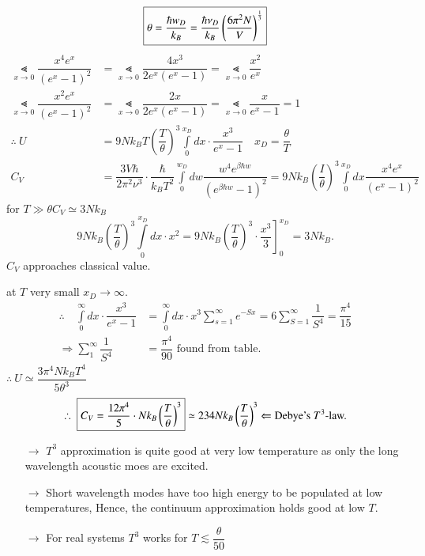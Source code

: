 \chapter{}\label{lec20}

$$
\fbox{$\theta=\dfrac{\hbar w_{D}}{k_{B}}=\dfrac{\hbar \nu_{D}}{k_{B}}\left(\dfrac{6\pi^{2}N}{V}\right)^{\frac{1}{3}}$}
$$
\begin{align*}
\Lt\limits_{x\to 0}\dfrac{x^{4}e^{x}}{(e^{x}-1)^{2}} &= \Lt\limits_{x\to 0}\dfrac{4x^{3}}{2e^{x}(e^{x}-1)}=\Lt\limits_{x\to 0}\dfrac{x^{2}}{e^{x}}\\
\Lt\limits_{x\to 0}\dfrac{x^{2}e^{x}}{(e^{x}-1)^{2}} &= \Lt\limits_{x\to 0}\dfrac{2x}{2e^{x}(e^{x}-1)}=\Lt\limits_{x\to 0}\dfrac{x}{e^{x}-1}=1\\
\therefore \ U &= 9Nk_{B}T\left(\dfrac{T}{\theta}\right)^{3}\int\limits^{x_{D}}_{0}dx\cdot \dfrac{x^{3}}{e^{x}-1}\quad x_{D}=\dfrac{\theta}{T}\\
C_{V} &= \dfrac{3V\hbar}{2\pi^{2}\nu^{3}}\cdot \dfrac{\hbar}{k_{B}T^{2}}\int\limits^{w_{D}}_{0}dw\dfrac{w^{4}e^{\beta\hbar w}}{(e^{\beta\hbar w}-1)^{2}}=9Nk_{B}\left(\dfrac{I}{\theta}\right)^{3}\int\limits^{x_{D}}_{0}dx\dfrac{x^{4}e^{x}}{(e^{x}-1)^{2}}
\end{align*}
for $T\gg \theta$\quad $C_{V}\simeq 3Nk_{B}$
$$
9Nk_{B}\left(\dfrac{T}{\theta}\right)^{3}\int\limits^{x_{D}}_{0}dx\cdot x^{2}=9Nk_{B}\left(\dfrac{T}{\theta}\right)^{3}\cdot \left.\dfrac{x^{3}}{3}\right]^{x_{D}}_{0}=3Nk_{B}.
$$
$C_{V}$ approaches classical value.

at $T$ very small $x_{D}\to \infty$.
\begin{align*}
\therefore\quad \int\limits^{\infty}_{0}dx\cdot \dfrac{x^{3}}{e^{x}-1} &=\int\limits^{\infty}_{0}dx\cdot x^{3}\sum\limits^{\infty}_{s=1}e^{-Sx}=6\sum\limits^{\infty}_{S=1}\dfrac{1}{S^{4}}=\dfrac{\pi^{4}}{15}\\
\Rightarrow \sum\limits^{\infty}_{1}\dfrac{1}{S^{4}} &= \dfrac{\pi^{4}}{90}\text{ found from table.}
\end{align*}
$\therefore \ U\simeq \dfrac{3\pi^{4}Nk_{B}T^{4}}{5\theta^{3}}$
$$
\therefore \ \fbox{$C_{V}=\dfrac{12\pi^{4}}{5}\cdot Nk_{B}\left(\dfrac{T}{\theta}\right)^{3}$} \simeq 234Nk_{B}\left(\dfrac{T}{\theta}\right)^{3}\Leftarrow \text{Debye's $T^{3}$-law.}
$$
\begin{itemize}
\item[$\to$] $T^{3}$ approximation is quite good at very low temperature as only the long wavelength acoustic moes are excited.

\item[$\to$] Short wavelength modes have too high energy to be populated at low temperatures, Hence, the continuum approximation holds good at low $T$.

\item[$\to$] For real systems $T^{3}$ works for $T\lesssim \dfrac{\theta}{50}$
\end{itemize}

